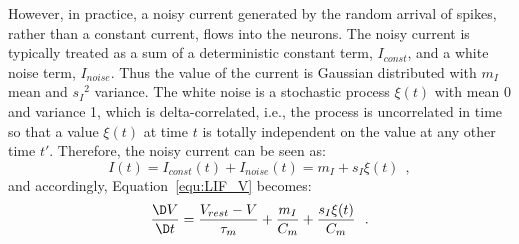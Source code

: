 	However, in practice, a noisy current generated by the random arrival of spikes, rather than a constant current, flows into the neurons.
	The noisy current is typically treated as a sum of a deterministic constant term, $I_{const}$, and a white noise term, $I_{noise}$.
	Thus the value of the current is Gaussian distributed with $m_I$ mean and ${s_I}^2$ variance.
	The white noise is a stochastic process $\xi(t)$ with mean 0 and variance 1, which is delta-correlated, i.e., the process is uncorrelated in time so that a value $\xi(t)$ at time $t$ is totally independent on the value at any other time $t'$.
	Therefore, the noisy current can be seen as:
	\begin{equation}
	I(t) = I_{const}(t)+I_{noise}(t) = m_I + s_I\xi(t)~~,
	\label{equ:noisyI}
	\end{equation}
	and accordingly, Equation~\ref{equ:LIF_V} becomes:
	\begin{equation}
	\frac{\D V}{\D t}=\frac{V_{rest} - V}{\tau_m } + \frac{m_I}{C_m} + \frac{s_I\xi(t)}{C_m}~~.
	\label{equ:LIF_V2}
	\end{equation}

